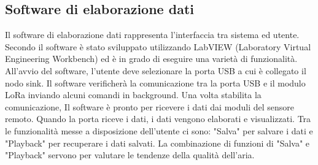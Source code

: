 \documentclass[a4paper]{report} %
\begin{document}
\subsection{Software di elaborazione dati}
Il software di elaborazione dati rappresenta l'interfaccia tra sistema ed utente. Secondo \cite{art:rif.40} il software è stato sviluppato utilizzando LabVIEW (Laboratory Virtual Engineering Workbench) ed è in grado di eseguire una varietà di funzionalità. All'avvio del software, l'utente deve selezionare la porta USB a cui è collegato il nodo sink. Il software verificherà la comunicazione tra la porta USB e il modulo LoRa inviando alcuni comandi in background. Una volta stabilita la comunicazione, Il software è pronto per ricevere i dati dai moduli del sensore remoto. Quando la porta riceve i dati, i dati vengono elaborati e visualizzati. Tra le funzionalità messe a disposizione dell'utente ci sono: "Salva" per salvare i dati e "Playback" per recuperare i dati salvati. La combinazione di funzioni di "Salva" e "Playback" servono per valutare le tendenze della qualità dell'aria. 
\end{document}

